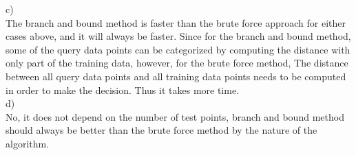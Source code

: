 \documentclass[12pt]{article}
\begin{document}
c)\\
\indent The branch and bound method is faster than the brute force approach for either cases above, and it will always be faster. Since for the branch and bound method, some of the query data points can be categorized by computing the distance with only part of the training data, however, for the brute force method, The distance between all query data points and all training data points needs to be computed in order to make the decision. Thus it takes more time.\\
d)\\
\indent No, it does not depend on the number of test points, branch and bound method should always be better than the brute force method by the nature of the algorithm.
\end{document}
